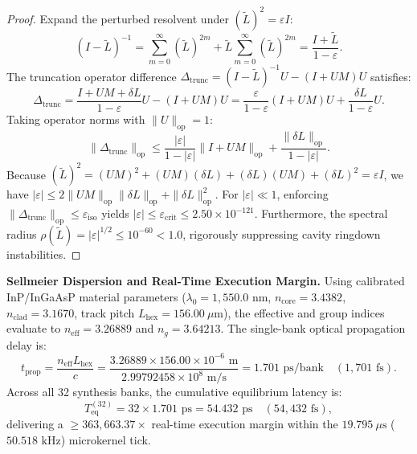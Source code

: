 \documentclass[11pt,onecolumn]{article}
\begin{document}
\begin{proof}
Expand the perturbed resolvent under $(\tilde{L})^2 = \varepsilon I$:
\begin{equation}
    (I - \tilde{L})^{-1} = \sum_{m=0}^\infty (\tilde{L})^{2m} + \tilde{L}\sum_{m=0}^\infty (\tilde{L})^{2m} = \frac{I + \tilde{L}}{1 - \varepsilon}.
\end{equation}
The truncation operator difference $\Delta_{\mathrm{trunc}} = (I - \tilde{L})^{-1}U - (I + UM)U$ satisfies:
\begin{equation}
    \Delta_{\mathrm{trunc}} = \frac{I + UM + \delta L}{1 - \varepsilon} U - (I + UM)U = \frac{\varepsilon}{1 - \varepsilon}(I + UM)U + \frac{\delta L}{1 - \varepsilon}U.
\end{equation}
Taking operator norms with $\|U\|_{\mathrm{op}} = 1$:
\begin{equation}
    \|\Delta_{\mathrm{trunc}}\|_{\mathrm{op}} \le \frac{|\varepsilon|}{1 - |\varepsilon|} \|I + UM\|_{\mathrm{op}} + \frac{\|\delta L\|_{\mathrm{op}}}{1 - |\varepsilon|}.
\end{equation}
Because $(\tilde{L})^2 = (UM)^2 + (UM)(\delta L) + (\delta L)(UM) + (\delta L)^2 = \varepsilon I$, we have $|\varepsilon| \le 2\|UM\|_{\mathrm{op}}\|\delta L\|_{\mathrm{op}} + \|\delta L\|_{\mathrm{op}}^2$. For $|\varepsilon| \ll 1$, enforcing $\|\Delta_{\mathrm{trunc}}\|_{\mathrm{op}} \le \varepsilon_{\mathrm{iso}}$ yields $|\varepsilon| \le \varepsilon_{\mathrm{crit}} \le 2.50 \times 10^{-121}$. Furthermore, the spectral radius $\rho(\tilde{L}) = |\varepsilon|^{1/2} \le 10^{-60} < 1.0$, rigorously suppressing cavity ringdown instabilities.
\end{proof}

\noindent\textbf{Sellmeier Dispersion and Real-Time Execution Margin.}
Using calibrated InP/InGaAsP material parameters ($\lambda_0 = 1{,}550.0\text{ nm}$, $n_{\text{core}} = 3.4382$, $n_{\text{clad}} = 3.1670$, track pitch $L_{\text{hex}} = 156.00\ \mu\text{m}$), the effective and group indices evaluate to $n_{\text{eff}} = 3.26889$ and $n_g = 3.64213$. The single-bank optical propagation delay is:
\begin{equation}
    t_{\text{prop}} = \frac{n_{\text{eff}} L_{\text{hex}}}{c} = \frac{3.26889 \times 156.00 \times 10^{-6}\text{ m}}{2.99792458 \times 10^8\text{ m/s}} = 1.701\text{ ps/bank} \quad (1{,}701\text{ fs}).
\end{equation}
Across all 32 synthesis banks, the cumulative equilibrium latency is:
\begin{equation}
    T_{\text{eq}}^{(32)} = 32 \times 1.701\text{ ps} = 54.432\text{ ps} \quad (54{,}432\text{ fs}),
\end{equation}
delivering a $\ge 363{,}663.37\times$ real-time execution margin within the $19.795\ \mu\text{s}$ ($50.518\text{ kHz}$) microkernel tick.
\end{document}
